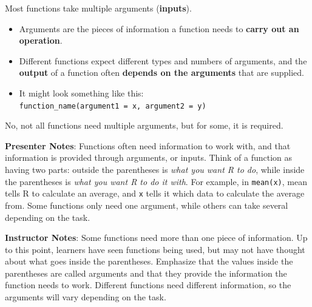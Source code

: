 \documentclass[
  letterpaper,
  DIV=11,
  numbers=noendperiod]{scrartcl}
\providecommand{\tightlist}{%
  \setlength{\itemsep}{0pt}\setlength{\parskip}{0pt}}
\begin{document}
Most functions take multiple arguments (\textbf{inputs}).

\begin{itemize}
\tightlist
\item
  Arguments are the pieces of information a function needs to
  \textbf{carry out an operation}.
\item
  Different functions expect different types and numbers of arguments,
  and the \textbf{output} of a function often \textbf{depends on the
  arguments} that are supplied.
\item
  It might look something like this:
  \texttt{function\_name(argument1\ =\ x,\ argument2\ =\ y)}
\end{itemize}

\begin{tcolorbox}[enhanced jigsaw, arc=.35mm, bottomrule=.15mm, bottomtitle=1mm, breakable, colback=white, colbacktitle=quarto-callout-note-color!10!white, colframe=quarto-callout-note-color-frame, coltitle=black, left=2mm, leftrule=.75mm, opacityback=0, opacitybacktitle=0.6, rightrule=.15mm, title=\textcolor{quarto-callout-note-color}{\faInfo}\hspace{0.5em}{Do all functions need multiple arguments?}, titlerule=0mm, toprule=.15mm, toptitle=1mm]

No, not all functions need multiple arguments, but for some, it is
required.

\end{tcolorbox}

\textbf{Presenter Notes}: Functions often need information to work with,
and that information is provided through arguments, or inputs. Think of
a function as having two parts: outside the parentheses is \emph{what
you want R to do}, while inside the parentheses is \emph{what you want R
to do it with}. For example, in \texttt{mean(x)}, mean tells R to
calculate an average, and \texttt{x} tells it which data to calculate
the average from. Some functions only need one argument, while others
can take several depending on the task.

\textbf{Instructor Notes}: Some functions need more than one piece of
information. Up to this point, learners have seen functions being used,
but may not have thought about what goes inside the parentheses.
Emphasize that the values inside the parentheses are called arguments
and that they provide the information the function needs to work.
Different functions need different information, so the arguments will
vary depending on the task.
\end{document}
